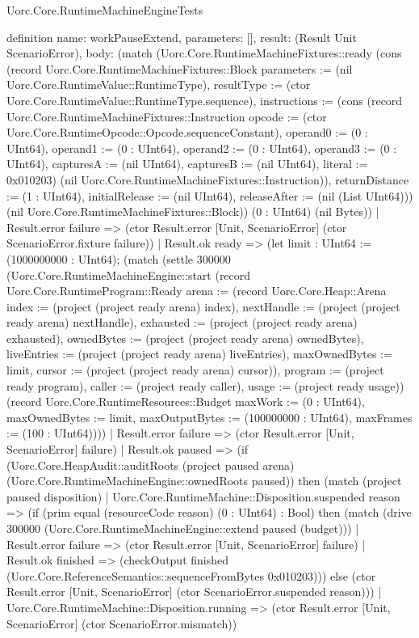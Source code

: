 \begin{lexlean}{Uorc.Core.RuntimeMachineEngineTests}
\begin{semanticmodule}
definition{
  name: workPauseExtend,
  parameters: [],
  result: (Result Unit ScenarioError),
  body: (match (Uorc.Core.RuntimeMachineFixtures::ready (cons (record Uorc.Core.RuntimeMachineFixtures::Block {parameters := (nil Uorc.Core.RuntimeValue::RuntimeType), resultType := (ctor Uorc.Core.RuntimeValue::RuntimeType.sequence), instructions := (cons (record Uorc.Core.RuntimeMachineFixtures::Instruction {opcode := (ctor Uorc.Core.RuntimeOpcode::Opcode.sequenceConstant), operand0 := (0 : UInt64), operand1 := (0 : UInt64), operand2 := (0 : UInt64), operand3 := (0 : UInt64), capturesA := (nil UInt64), capturesB := (nil UInt64), literal := 0x010203}) (nil Uorc.Core.RuntimeMachineFixtures::Instruction)), returnDistance := (1 : UInt64), initialRelease := (nil UInt64), releaseAfter := (nil (List UInt64))}) (nil Uorc.Core.RuntimeMachineFixtures::Block)) (0 : UInt64) (nil Bytes))
    | Result.error failure => (ctor Result.error [Unit, ScenarioError] (ctor ScenarioError.fixture failure))
    | Result.ok ready => (let limit : UInt64 := (1000000000 : UInt64); (match (settle 300000 (Uorc.Core.RuntimeMachineEngine::start (record Uorc.Core.RuntimeProgram::Ready {arena := (record Uorc.Core.Heap::Arena {index := (project (project ready arena) index), nextHandle := (project (project ready arena) nextHandle), exhausted := (project (project ready arena) exhausted), ownedBytes := (project (project ready arena) ownedBytes), liveEntries := (project (project ready arena) liveEntries), maxOwnedBytes := limit, cursor := (project (project ready arena) cursor)}), program := (project ready program), caller := (project ready caller), usage := (project ready usage)}) (record Uorc.Core.RuntimeResources::Budget {maxWork := (0 : UInt64), maxOwnedBytes := limit, maxOutputBytes := (100000000 : UInt64), maxFrames := (100 : UInt64)})))
      | Result.error failure => (ctor Result.error [Unit, ScenarioError] failure)
      | Result.ok paused => (if (Uorc.Core.HeapAudit::auditRoots (project paused arena) (Uorc.Core.RuntimeMachineEngine::ownedRoots paused)) then (match (project paused disposition)
        | Uorc.Core.RuntimeMachine::Disposition.suspended reason => (if (prim equal (resourceCode reason) (0 : UInt64) : Bool) then (match (drive 300000 (Uorc.Core.RuntimeMachineEngine::extend paused (budget)))
          | Result.error failure => (ctor Result.error [Unit, ScenarioError] failure)
          | Result.ok finished => (checkOutput finished (Uorc.Core.ReferenceSemantics::sequenceFromBytes 0x010203))) else (ctor Result.error [Unit, ScenarioError] (ctor ScenarioError.suspended reason)))
        | Uorc.Core.RuntimeMachine::Disposition.running => (ctor Result.error [Unit, ScenarioError] (ctor ScenarioError.mismatch))
}
\end{semanticmodule}
\end{lexlean}
